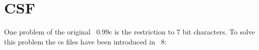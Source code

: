 
\section{CSF}%
\label{sec:csf}%

One problem of the original \BibTeX~0.99c is the restriction to 7 bit
characters. To solve this problem the cs files have been introduced in
\BibTeX~8:

\INCOMPLETE


\endinput
%
